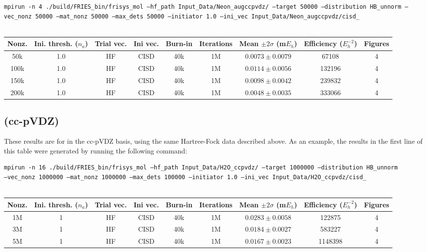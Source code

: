 \documentclass[12pt, landscape]{article}
\begin{document}
\texttt{mpirun -n 4 ./build/FRIES\_bin/frisys\_mol --hf\_path Input\_Data/Neon\_augccpvdz/ --target 50000 --distribution HB\_unnorm --vec\_nonz 50000 --mat\_nonz 50000 --max\_dets 50000 --initiator 1.0 --ini\_vec Input\_Data/Neon\_augccpvdz/cisd\_}
\\~\\
\begin{tabular}{c|c|c|c|c|c|c|c|c}
Nonz. & Ini. thresh. ($n_a$) & Trial vec. & Ini vec. & Burn-in & Iterations & Mean $\pm 2 \sigma$ (m$E_h$) & Efficiency ($E_h^{-2}$) & Figures \\ \hline
50k & 1.0 & HF & CISD & 40k & 1M & $0.0073 \pm 0.0079$ & 67108 & 4 \\
100k & 1.0 & HF & CISD & 40k & 1M & $0.0114 \pm 0.0056$ & 132196 & 4 \\
150k & 1.0 & HF & CISD & 40k & 1M & $0.0098 \pm 0.0042$ & 239832 & 4 \\
200k & 1.0 & HF & CISD & 40k & 1M & $0.0048 \pm 0.0035$ & 333066 & 4 \\
\end{tabular}


\subsection*{ (cc-pVDZ)}
These results are for  in the cc-pVDZ basis, using the same Hartree-Fock data described above. As an example, the results in the first line of this table were generated by running the following command:

\texttt{mpirun -n 16 ./build/FRIES\_bin/frisys\_mol --hf\_path Input\_Data/H2O\_ccpvdz/ --target 1000000 --distribution HB\_unnorm}\\ \texttt{--vec\_nonz 1000000 --mat\_nonz 1000000 --max\_dets 100000 --initiator 1.0 --ini\_vec Input\_Data/H2O\_ccpvdz/cisd\_}
\\~\\
\begin{tabular}{c|c|c|c|c|c|c|c|c}
Nonz. & Ini. thresh. ($n_a$) & Trial vec. & Ini vec. & Burn-in & Iterations & Mean $\pm 2 \sigma$ (m$E_h$) & Efficiency ($E_h^{-2}$) & Figures \\ \hline
1M & 1 & HF & CISD & 40k & 1M & $0.0283 \pm 0.0058$ & 122875 & 4\\
3M & 1 & HF & CISD & 40k & 1M & $0.0184 \pm 0.0027$ & 583227 & 4\\
5M & 1 & HF & CISD & 40k & 1M & $0.0167 \pm 0.0023$ & 1148398 & 4\\
\end{tabular}
\end{document}
